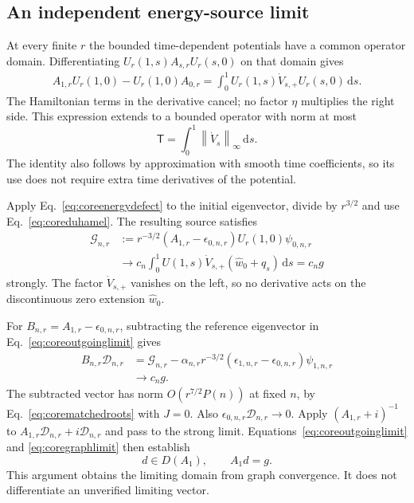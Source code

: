 \documentclass[aps,pra,reprint,superscriptaddress,longbibliography]{revtex4-2}
\newcommand{\dd}{\mathrm d}
\newcommand{\norm}[1]{\left\lVert#1\right\rVert}
\begin{document}
\subsection{An independent energy-source limit}

At every finite $r$ the bounded time-dependent potentials have a common
operator domain. Differentiating
$U_r(1,s)A_{s,r}U_r(s,0)$ on that domain gives
\begin{align}
 A_{1,r}U_r(1,0)-U_r(1,0)A_{0,r}
  =\int_0^1U_r(1,s)\dot V_{s,+}U_r(s,0)\,\dd s.
 \label{eq:coreenergydefect}
\end{align}
The Hamiltonian terms in the derivative cancel; no factor $\eta$
multiplies the right side. This expression extends to a bounded operator
with norm at most
\begin{equation}
 \mathsf T=\int_0^1\norm{\dot V_s}_\infty\,\dd s.
 \label{eq:corevariationbudget}
\end{equation}
The identity also follows by approximation with smooth time coefficients,
so its use does not require extra time derivatives of the potential.

Apply Eq.~\eqref{eq:coreenergydefect} to the initial eigenvector, divide
by $r^{3/2}$ and use Eq.~\eqref{eq:coreduhamel}. The resulting source
satisfies
\begin{align}
 \mathcal G_{n,r}
 &:=r^{-3/2}(A_{1,r}-\epsilon_{0,n,r})
                    U_r(1,0)\psi_{0,n,r}\nonumber\\
 &\longrightarrow c_n\int_0^1U(1,s)\dot V_{s,+}
                         (\widehat w_0+q_s)\,\dd s=c_ng
 \label{eq:coreenergysourcelimit}
\end{align}
strongly. The factor $\dot V_{s,+}$ vanishes on the left, so no derivative
acts on the discontinuous zero extension $\widehat w_0$.

For $B_{n,r}=A_{1,r}-\epsilon_{0,n,r}$, subtracting the reference
eigenvector in Eq.~\eqref{eq:coreoutgoinglimit} gives
\begin{align}
 B_{n,r}\mathcal D_{n,r}
 &=\mathcal G_{n,r}
 -\alpha_{n,r}r^{-3/2}(\epsilon_{1,n,r}-\epsilon_{0,n,r})
                         \psi_{1,n,r}\nonumber\\
 &\longrightarrow c_ng.
 \label{eq:coregraphlimit}
\end{align}
The subtracted vector has norm $O(r^{7/2}P(n))$ at fixed $n$, by
Eq.~\eqref{eq:corematchedroots} with $J=0$. Also
$\epsilon_{0,n,r}\mathcal D_{n,r}\to0$. Apply
$(A_{1,r}+i)^{-1}$ to
$A_{1,r}\mathcal D_{n,r}+i\mathcal D_{n,r}$ and pass to the strong limit.
Equations~\eqref{eq:coreoutgoinglimit} and \eqref{eq:coregraphlimit}
then establish
\begin{equation}
 d\in D(A_1),\qquad A_1d=g.
 \label{eq:coregraphidentity}
\end{equation}
This argument obtains the limiting domain from graph convergence. It
does not differentiate an unverified limiting vector.
\end{document}
